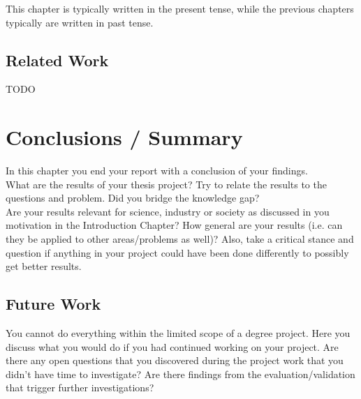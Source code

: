 \documentclass[a4paper,12pt]{article}
\begin{document}
This chapter is typically written in the present tense, while the previous chapters typically are written in past tense.

\subsection{Related Work}
\label{Discussion_relatedWork}
TODO

\newpage
		
\section{Conclusions / Summary}
\label{Conclusions}
In this chapter you end your report with a conclusion of your findings.  \\

\noindent What are the results of your thesis project? Try to relate the results to the questions and problem. Did you bridge the knowledge gap? \\

\noindent Are your results relevant for science, industry or society as discussed in you motivation in the Introduction Chapter? How general are your results (i.e. can they be applied to other areas/problems as well)? Also, take a critical stance and question if anything in your project could have been done differently to possibly get better results. \\

\subsection{Future Work}
\label{Conclusions_futureWork}
\noindent You cannot do everything within the limited scope of a degree project. Here you discuss what you would do if you had continued working on your project. Are there any open questions that you discovered during the project work that you didn’t have time to investigate? Are there findings from the evaluation/validation that trigger further investigations?

\newpage
\hypersetup{urlcolor=black}
%
%
\printbibliography[heading=bibintoc]

\newpage
\setcounter{page}{1} %
\appendix
\end{document}

